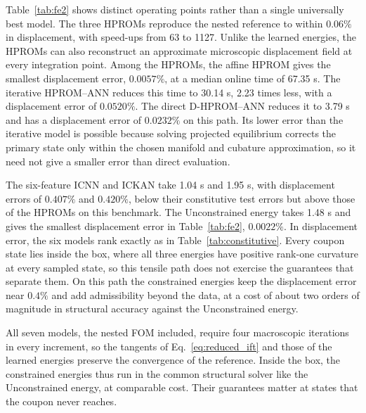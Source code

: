 Table~\ref{tab:fe2} shows distinct operating points rather than a single universally best model. The three HPROMs reproduce the nested reference to within $0.06\%$ in displacement, with speed-ups from 63 to 1127. Unlike the learned energies, the HPROMs can also reconstruct an approximate microscopic displacement field at every integration point. Among the HPROMs, the affine HPROM gives the smallest displacement error, $0.0057\%$, at a median online time of 67.35 s. The iterative HPROM--ANN reduces this time to 30.14 s, 2.23 times less, with a displacement error of $0.0520\%$. The direct D-HPROM--ANN reduces it to 3.79 s and has a displacement error of $0.0232\%$ on this path. Its lower error than the iterative model is possible because solving projected equilibrium corrects the primary state only within the chosen manifold and cubature approximation, so it need not give a smaller error than direct evaluation.

The six-feature ICNN and ICKAN take 1.04 s and 1.95 s, with displacement errors of $0.407\%$ and $0.420\%$, below their constitutive test errors but above those of the HPROMs on this benchmark. The Unconstrained energy takes 1.48 s and gives the smallest displacement error in Table~\ref{tab:fe2}, $0.0022\%$. In displacement error, the six models rank exactly as in Table~\ref{tab:constitutive}. Every coupon state lies inside the box, where all three energies have positive rank-one curvature at every sampled state, so this tensile path does not exercise the guarantees that separate them. On this path the constrained energies keep the displacement error near $0.4\%$ and add admissibility beyond the data, at a cost of about two orders of magnitude in structural accuracy against the Unconstrained energy.

All seven models, the nested FOM included, require four macroscopic iterations in every increment, so the tangents of Eq.~\eqref{eq:reduced_ift} and those of the learned energies preserve the convergence of the reference. Inside the box, the constrained energies thus run in the common structural solver like the Unconstrained energy, at comparable cost. Their guarantees matter at states that the coupon never reaches.

